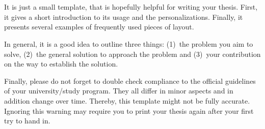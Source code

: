 \documentclass[../main.tex]{subfiles}
\begin{document}
\chapter*{\myAbstractTitle}

It is just a small template, that is hopefully helpful for writing your thesis.
First, it gives a short introduction to its usage and the personalizations.
Finally, it presents several examples of frequently used pieces of layout.

In general, it is a good idea to outline three things:
(1)~the problem you aim to solve,
(2)~the general solution to approach the problem and
(3)~your contribution on the way to establish the solution.

Finally, please do not forget to double check compliance to the official guidelines of your university/study program.
They all differ in minor aspects and in addition change over time.
Thereby, this template might not be fully accurate.
Ignoring this warning may require you to print your thesis again after your first try to hand in.
\end{document}
